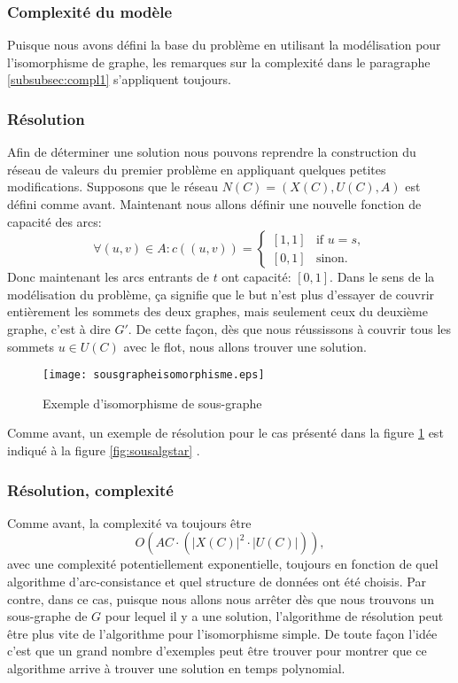 \documentclass[french]{article}
\theoremstyle{definition}
\theoremstyle{remark}
\begin{document}
\subsubsection{Complexité du modèle}
Puisque nous avons défini la base du problème en utilisant la modélisation pour l'isomorphisme de graphe, les remarques sur la complexité dans le paragraphe \ref{subsubsec:compl1} s'appliquent toujours.

\subsubsection{Résolution}
\label{sssec:res}
Afin de déterminer une solution nous pouvons reprendre la construction du réseau de valeurs du premier problème en appliquant quelques petites modifications. Supposons que le réseau $N(C)=(X(C), U(C), A)$ est défini comme avant. Maintenant nous allons définir une nouvelle fonction de capacité des arcs:
\[  \forall (u,v) \in A:
c((u,v))= 
\begin{cases}
[1,1]& \text{if } u=s,\\
[0,1]              & \text{sinon}.
\end{cases}
\]
Donc maintenant les arcs entrants de $t$ ont capacité: $[0,1]$. Dans le sens de la modélisation du problème, ça signifie que le but n'est plus d'essayer de couvrir entièrement les sommets des deux graphes, mais seulement ceux du deuxième graphe, c'est à dire $G'$. De cette façon, dès que nous réussissons à couvrir tous les sommets $u \in U(C)$ avec le flot, nous allons trouver une solution. 
\begin{figure}[t]
	\centering
	\texttt{[image: sousgrapheisomorphisme.eps]}
	\caption{\label{fig:isosubgraph}Exemple d'isomorphisme de sous-graphe}
\end{figure}
Comme avant, un exemple de résolution pour le cas présenté dans la figure \ref{fig:isosubgraph} est indiqué à la figure \ref{fig:sousalgstar} .

\subsubsection{Résolution, complexité}
Comme avant, la complexité va toujours être 
 $$O(AC \cdot (|X(C)|^2 \cdot |U(C)|)),$$
avec une complexité potentiellement exponentielle, toujours en fonction de quel algorithme d'arc-consistance et quel structure de données ont été choisis. Par contre, dans ce cas, puisque nous allons nous arrêter dès que nous trouvons un sous-graphe de $G$ pour lequel il y a une solution, l'algorithme de résolution peut être plus vite de l'algorithme pour l'isomorphisme simple. De toute façon l'idée c'est que un grand nombre d'exemples peut être trouver pour montrer que ce algorithme arrive à trouver une solution en temps polynomial.
\end{document}
